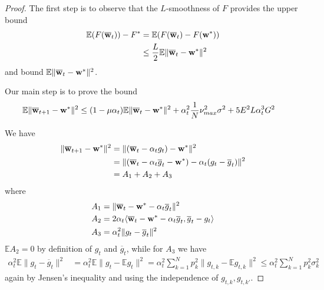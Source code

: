 \begin{proof}
	The first step is to observe that the $L$-smoothness of $F$ provides
	the upper bound
	\begin{align*}
	\mathbb{E}(F({\overline{\mathbf{w}}}_{t}))-F^{\ast} & =\mathbb{E}(F({\overline{\mathbf{w}}}_{t})-F({\mathbf{w}}^{\ast}))\\
	& \leq\frac{L}{2}\mathbb{E}\|{\overline{\mathbf{w}}}_{t}-{\mathbf{w}}^{\ast}\|^{2}
	\end{align*}
	and bound $\mathbb{E}\|{\overline{\mathbf{w}}}_{t}-{\mathbf{w}}^{\ast}\|^{2}$. 
	
	Our main step is to prove the bound 
	\begin{align*}
	\mathbb{E}\|{\overline{\mathbf{w}}}_{t+1}-{\mathbf{w}}^{\ast}\|^{2} & \leq(1-\mu\alpha_{t})\mathbb{E}\|{\overline{\mathbf{w}}}_{t}-{\mathbf{w}}^{\ast}\|^{2}+\alpha_{t}^{2}\frac{1}{N}\nu_{max}^{2}\sigma^{2}+5E^{2}L\alpha_{t}^{3}G^{2}
	\end{align*}
	
	We have 
	\begin{align*}
	\|{\overline{\mathbf{w}}}_{t+1}-{\mathbf{w}}^{\ast}\|^{2} & =\|({\overline{\mathbf{w}}}_{t}-\alpha_{t}g_{t})-{\mathbf{w}}^{\ast}\|^{2}\\
	& =\|({\overline{\mathbf{w}}}_{t}-\alpha_{t}\overline{g}_{t}-{\mathbf{w}}^{\ast})-\alpha_{t}(g_{t}-\overline{g}_{t})\|^{2}\\
	& =A_{1}+A_{2}+A_{3}
	\end{align*}
	where 
	\begin{align*}
	A_{1} & =\|{\overline{\mathbf{w}}}_{t}-{\mathbf{w}}^{\ast}-\alpha_{t}\overline{g}_{t}\|^{2}\\
	A_{2} & =2\alpha_{t}\langle{\overline{\mathbf{w}}}_{t}-{\mathbf{w}}^{\ast}-\alpha_{t}\overline{g}_{t},\overline{g}_{t}-g_{t}\rangle\\
	A_{3} & =\alpha_{t}^{2}\|g_{t}-\overline{g}_{t}\|^{2}
	\end{align*}
	$\mathbb{E}A_{2}=0$ by definition of $g_{t}$ and $\overline{g}_{t}$,
	while for $A_{3}$ we have
	\begin{align*}
	\alpha_{t}^{2}\mathbb{E}\|g_{t}-\overline{g}_{t}\|^{2} & =\alpha_{t}^{2}\mathbb{E}\|g_{t}-\mathbb{E}g_{t}\|^{2}=\alpha_{t}^{2}\sum_{k=1}^{N}p_{k}^{2}\|g_{t,k}-\mathbb{E}g_{t,k}\|^{2}\leq\alpha_{t}^{2}\sum_{k=1}^{N}p_{k}^{2}\sigma_{k}^{2}
	\end{align*}
	again by Jensen's inequality and using the independence of $g_{t,k},g_{t,k'}$. 
	

\end{proof}
